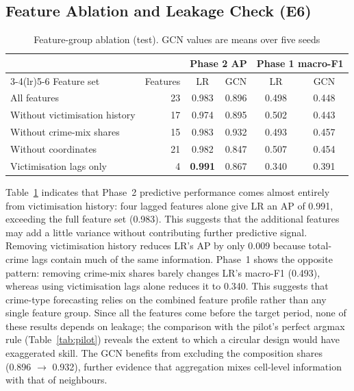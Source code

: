 \documentclass[11pt,a4paper]{report}
\begin{document}
\subsection{Feature Ablation and Leakage Check (E6)}
\begin{table}[H]
\centering\small
\caption{Feature-group ablation (test). GCN values are means over five seeds}
\label{tab:feat}
\begin{tabular}{@{}lrcccc@{}}
\toprule
 & & \multicolumn{2}{c}{Phase 2 AP} & \multicolumn{2}{c}{Phase 1 macro-F1}\\
\cmidrule(lr){3-4}\cmidrule(lr){5-6}
Feature set & Features & LR & GCN & LR & GCN\\
\midrule
All features & 23 & 0.983 & 0.896 & 0.498 & 0.448\\
Without victimisation history & 17 & 0.974 & 0.895 & 0.502 & 0.443\\
Without crime-mix shares & 15 & 0.983 & 0.932 & 0.493 & 0.457\\
Without coordinates & 21 & 0.982 & 0.847 & 0.507 & 0.454\\
Victimisation lags only & 4 & \textbf{0.991} & 0.867 & 0.340 & 0.391\\
\bottomrule
\end{tabular}
\end{table}
Table~\ref{tab:feat} indicates that Phase~2 predictive performance comes almost entirely from victimisation history: four lagged features alone give LR an AP of 0.991, exceeding the full feature set (0.983). This suggests that the additional features may add a little variance without contributing further predictive signal. Removing victimisation history reduces LR's AP by only 0.009 because total-crime lags contain much of the same information. Phase~1 shows the opposite pattern: removing crime-mix shares barely changes LR's macro-F1 (0.493), whereas using victimisation lags alone reduces it to 0.340. This suggests that crime-type forecasting relies on the combined feature profile rather than any single feature group. Since all the features come before the target period, none of these results depends on leakage; the comparison with the pilot's perfect argmax rule (Table~\ref{tab:pilot}) reveals the extent to which a circular design would have exaggerated skill. The GCN benefits from excluding the composition shares (0.896 $\to$ 0.932), further evidence that aggregation mixes cell-level information with that of neighbours.
\end{document}
